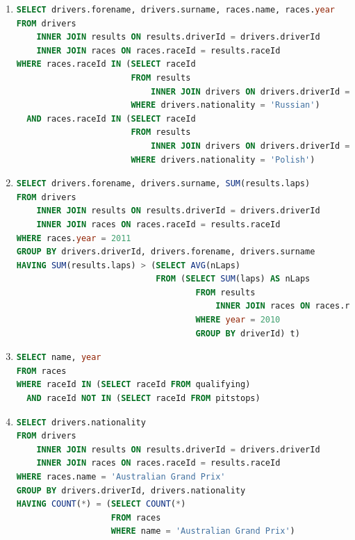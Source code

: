 \documentclass{db-practice}
\begin{document}
\begin{enumerate}
\item
\begin{lstlisting}[language=SQL]
SELECT drivers.forename, drivers.surname, races.name, races.year
FROM drivers
    INNER JOIN results ON results.driverId = drivers.driverId
    INNER JOIN races ON races.raceId = results.raceId
WHERE races.raceId IN (SELECT raceId
                       FROM results 
                           INNER JOIN drivers ON drivers.driverId = results.driverId
                       WHERE drivers.nationality = 'Russian')
  AND races.raceId IN (SELECT raceId
                       FROM results 
                           INNER JOIN drivers ON drivers.driverId = results.driverId
                       WHERE drivers.nationality = 'Polish')
\end{lstlisting}
      
\item
\begin{lstlisting}[language=SQL]
SELECT drivers.forename, drivers.surname, SUM(results.laps)
FROM drivers
    INNER JOIN results ON results.driverId = drivers.driverId
    INNER JOIN races ON races.raceId = results.raceId
WHERE races.year = 2011
GROUP BY drivers.driverId, drivers.forename, drivers.surname
HAVING SUM(results.laps) > (SELECT AVG(nLaps)
                            FROM (SELECT SUM(laps) AS nLaps
                                    FROM results
                                        INNER JOIN races ON races.raceId = results.raceId
                                    WHERE year = 2010
                                    GROUP BY driverId) t)
\end{lstlisting}

\item
\begin{lstlisting}[language=SQL]
SELECT name, year
FROM races
WHERE raceId IN (SELECT raceId FROM qualifying)
  AND raceId NOT IN (SELECT raceId FROM pitstops)
\end{lstlisting}

\item
\begin{lstlisting}[language=SQL]
SELECT drivers.nationality
FROM drivers
    INNER JOIN results ON results.driverId = drivers.driverId
    INNER JOIN races ON races.raceId = results.raceId
WHERE races.name = 'Australian Grand Prix'
GROUP BY drivers.driverId, drivers.nationality
HAVING COUNT(*) = (SELECT COUNT(*)
                   FROM races
                   WHERE name = 'Australian Grand Prix')
\end{lstlisting}


\end{enumerate}
\end{document}
